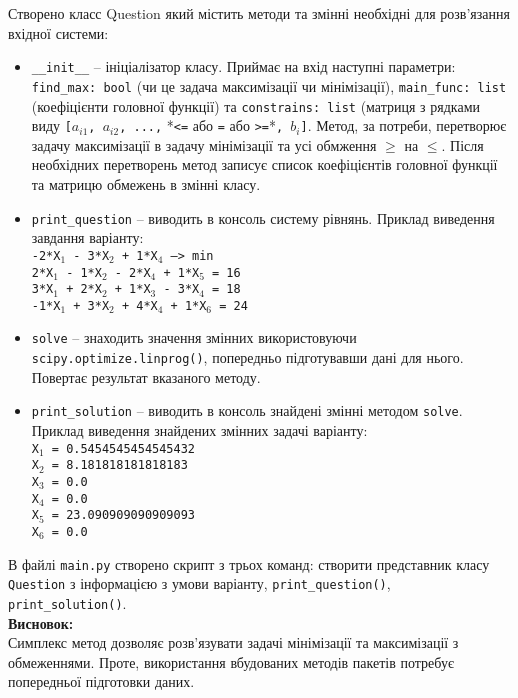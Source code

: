 \documentclass{article}
\begin{document}
Створено класс Question який містить методи та змінні необхідні для розв'язання вхідної системи:
\begin{itemize}
	\item\texttt{\_\_init\_\_} -- ініціалізатор класу. Приймає на вхід наступні параметри: \texttt{find\_max: bool} (чи це задача максимізації чи мінімізації),  \texttt{main\_func: list} (коефіцієнти головної функції) та \texttt{constrains: list} (матриця з рядками виду \texttt{[$a_{i1}$, $a_{i2}$, ...,} *\texttt{<=} або \texttt{=} або \texttt{>=}*\texttt{, $b_i$]}. Метод, за потреби, перетворює задачу максимізації в задачу мінімізації та усі обмження $\geq$ на $\leq$. Після необхідних перетворень метод записує список коефіцієнтів головної функції та матрицю обмежень в змінні класу.
	\item\texttt{print\_question} -- виводить в консоль систему рівнянь. Приклад виведення завдання варіанту:\\
	\texttt{-2*X$_1$ - 3*X$_2$ + 1*X$_4$ --> min\\
 2*X$_1$ - 1*X$_2$ - 2*X$_4$ + 1*X$_5$ = 16\\
 3*X$_1$ + 2*X$_2$ + 1*X$_3$ - 3*X$_4$ = 18\\
 -1*X$_1$ + 3*X$_2$ + 4*X$_4$ + 1*X$_6$ = 24}
 	\item\texttt{solve} -- знаходить значення змінних використовуючи \texttt{scipy.optimize.linprog()}, попередньо підготувавши дані для нього. Повертає результат вказаного методу.
 	\item\texttt{print\_solution} -- виводить в консоль знайдені змінні методом \texttt{solve}. Приклад виведення знайдених змінних задачі варіанту:\\
 	\texttt{X$_1$ = 0.5454545454545432\\
X$_2$ = 8.181818181818183\\
X$_3$ = 0.0\\
X$_4$ = 0.0\\
X$_5$ = 23.090909090909093\\
X$_6$ = 0.0}
\end{itemize}

В файлі \texttt{main.py} створено скрипт з трьох команд: створити представник класу \texttt{Question} з інформацією з умови варіанту, \texttt{print\_question()}, \texttt{print\_solution()}.\\

\textbf{Висновок:}\\

Симплекс метод дозволяє розв'язувати задачі мінімізації та максимізації з обмеженнями. Проте, використання вбудованих методів пакетів потребує попередньої підготовки даних.
\end{document}
